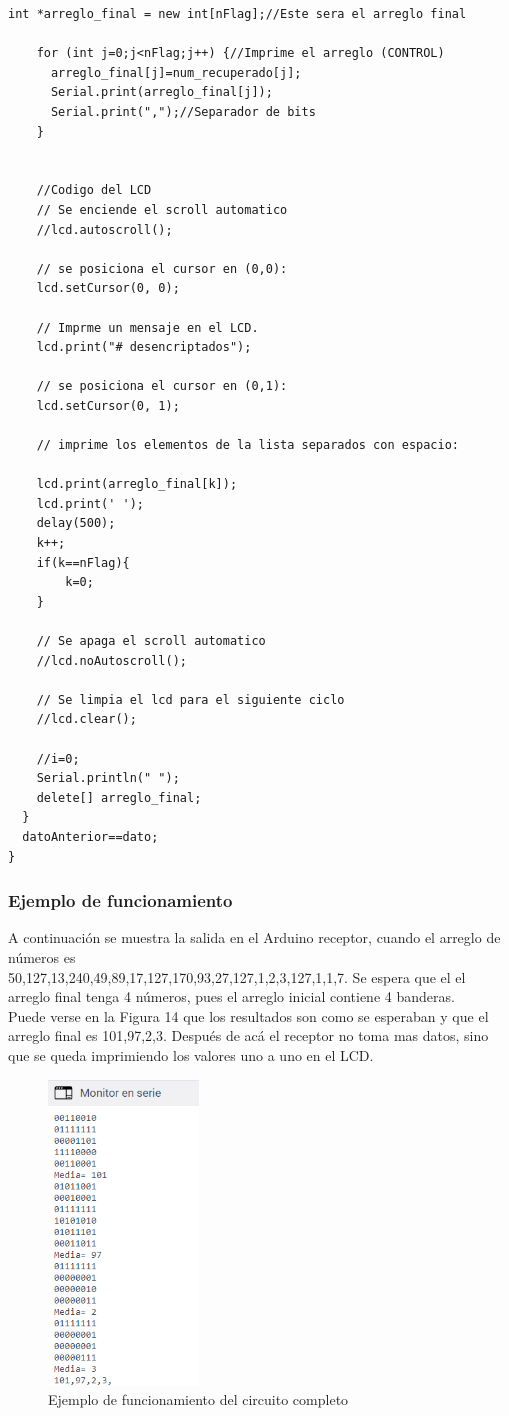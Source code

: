 \documentclass{article}
\begin{document}
\begin{lstlisting}[style=C++]
    int *arreglo_final = new int[nFlag];//Este sera el arreglo final
    
    for (int j=0;j<nFlag;j++) {//Imprime el arreglo (CONTROL)
      arreglo_final[j]=num_recuperado[j];
      Serial.print(arreglo_final[j]);
      Serial.print(",");//Separador de bits
    }
    
    
    //Codigo del LCD
    // Se enciende el scroll automatico
    //lcd.autoscroll();

    // se posiciona el cursor en (0,0):
    lcd.setCursor(0, 0);

    // Imprme un mensaje en el LCD.
    lcd.print("# desencriptados");

    // se posiciona el cursor en (0,1):
    lcd.setCursor(0, 1);

    // imprime los elementos de la lista separados con espacio:
    
    lcd.print(arreglo_final[k]);
    lcd.print(' ');
    delay(500);
    k++;
    if(k==nFlag){
    	k=0;
    }
    
    // Se apaga el scroll automatico
    //lcd.noAutoscroll();

    // Se limpia el lcd para el siguiente ciclo
    //lcd.clear();
    
    //i=0;
    Serial.println(" ");
    delete[] arreglo_final;
  }
  datoAnterior==dato;
}

\end{lstlisting}

\subsubsection{Ejemplo de funcionamiento}
A continuación se muestra la salida en el Arduino receptor, cuando el arreglo de números es\\
50,127,13,240,49,89,17,127,170,93,27,127,1,2,3,127,1,1,7. 
Se espera que el el arreglo final tenga 4 números, pues el arreglo inicial contiene 4 banderas.\\
Puede verse en la Figura 14 que los resultados son como se esperaban y que el arreglo final es 101,97,2,3. Después de acá el receptor no toma mas datos, sino que se queda imprimiendo los valores uno a uno en el LCD.

\begin{figure}[!ht] 
\includegraphics[width=4cm]{ejemploFuncionamiento.PNG}
\centering
\caption{Ejemplo de funcionamiento del circuito completo}
\end{figure}
\end{document}

